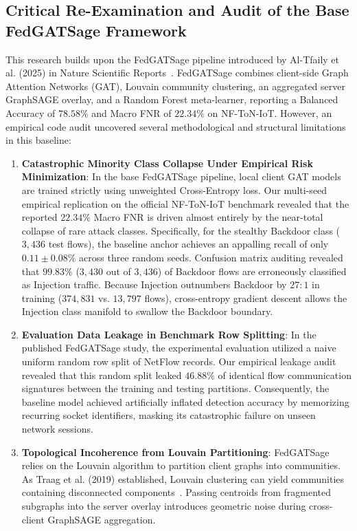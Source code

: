 \documentclass[12pt,a4paper]{report}
\begin{document}
\subsection{Critical Re-Examination and Audit of the Base FedGATSage Framework}
This research builds upon the FedGATSage pipeline introduced by Al-Tfaily et al. (2025) in Nature Scientific Reports~\cite{altfaily2025fedgatsage}. FedGATSage combines client-side Graph Attention Networks (GAT), Louvain community clustering, an aggregated server GraphSAGE overlay, and a Random Forest meta-learner, reporting a Balanced Accuracy of $78.58\%$ and Macro FNR of $22.34\%$ on NF-ToN-IoT. However, an empirical code audit uncovered several methodological and structural limitations in this baseline:
\begin{enumerate}
    \item \textbf{Catastrophic Minority Class Collapse Under Empirical Risk Minimization}: In the base FedGATSage pipeline, local client GAT models are trained strictly using unweighted Cross-Entropy loss. Our multi-seed empirical replication on the official NF-ToN-IoT benchmark revealed that the reported $22.34\%$ Macro FNR is driven almost entirely by the near-total collapse of rare attack classes. Specifically, for the stealthy Backdoor class ($3,436$ test flows), the baseline anchor achieves an appalling recall of only $0.11 \pm 0.08\%$ across three random seeds. Confusion matrix auditing revealed that $99.83\%$ ($3,430$ out of $3,436$) of Backdoor flows are erroneously classified as Injection traffic. Because Injection outnumbers Backdoor by $27:1$ in training ($374,831$ vs. $13,797$ flows), cross-entropy gradient descent allows the Injection class manifold to swallow the Backdoor boundary.
    \item \textbf{Evaluation Data Leakage in Benchmark Row Splitting}: In the published FedGATSage study, the experimental evaluation utilized a naive uniform random row split of NetFlow records. Our empirical leakage audit revealed that this random split leaked $46.88\%$ of identical flow communication signatures between the training and testing partitions. Consequently, the baseline model achieved artificially inflated detection accuracy by memorizing recurring socket identifiers, masking its catastrophic failure on unseen network sessions.
    \item \textbf{Topological Incoherence from Louvain Partitioning}: FedGATSage relies on the Louvain algorithm to partition client graphs into communities. As Traag et al. (2019) established, Louvain clustering can yield communities containing disconnected components~\cite{traag2019leiden}. Passing centroids from fragmented subgraphs into the server overlay introduces geometric noise during cross-client GraphSAGE aggregation.
\end{enumerate}
\end{document}
